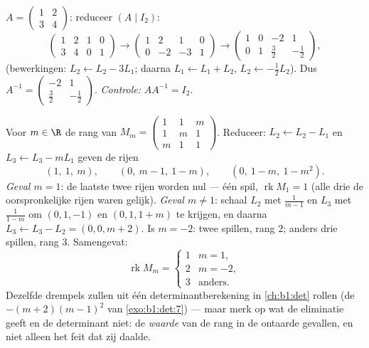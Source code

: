 \begin{example}\label{ex:b1:matrices:inverse}
$A = \begin{pmatrix} 1 & 2 \\ 3 & 4 \end{pmatrix}$: reduceer $(A
\mid I_2)$:
\[
\begin{pmatrix} 1 & 2 & 1 & 0\\ 3 & 4 & 0 & 1 \end{pmatrix}
\to
\begin{pmatrix} 1 & 2 & 1 & 0\\ 0 & -2 & -3 & 1 \end{pmatrix}
\to
\begin{pmatrix} 1 & 0 & -2 & 1\\ 0 & 1 & \tfrac32 & -\tfrac12
\end{pmatrix},
\]
(bewerkingen: $L_2 \leftarrow L_2 - 3L_1$; daarna $L_1 \leftarrow
L_1 + L_2$, $L_2 \leftarrow -\frac12 L_2$). Dus $A^{-1} =
\begin{pmatrix} -2 & 1 \\ \tfrac32 & -\tfrac12\end{pmatrix}$.
\emph{Controle:} $AA^{-1} = I_2$.
\end{example}

\begin{example}
\label{ex:b1:matrices:rankparameter}
Voor $m \in \R$ de rang van $M_m = \begin{pmatrix} 1 & 1 & m\\ 1 &
m & 1\\ m & 1 & 1\end{pmatrix}$. Reduceer: $L_2 \leftarrow L_2 -
L_1$ en $L_3 \leftarrow L_3 - mL_1$ geven de rijen
\[
(1,\ 1,\ m), \qquad (0,\ m - 1,\ 1 - m), \qquad
(0,\ 1 - m,\ 1 - m^2).
\]
\emph{Geval $m = 1$}: de laatste twee rijen worden nul --- één
spil, $\operatorname{rk} M_1 = 1$ (alle drie de oorspronkelijke
rijen waren gelijk). \emph{Geval $m \neq 1$}: schaal $L_2$ met
$\frac1{m-1}$ en $L_3$ met $\frac1{1-m}$ om $(0, 1, -1)$ en $(0,
1, 1 + m)$ te krijgen, en daarna $L_3 \leftarrow L_3 - L_2 = (0,
0, m + 2)$. Is $m = -2$: twee spillen, rang $2$; anders drie
spillen, rang $3$. Samengevat:
\[
\operatorname{rk} M_m =
\begin{cases}
1 & m = 1,\\
2 & m = -2,\\
3 & \text{anders}.
\end{cases}
\]
Dezelfde drempels zullen uit één determinantberekening in
\cref{ch:b1:det} rollen (de  $-(m+2)(m-1)^2$ van
\cref{exo:b1:det:7}) --- maar merk op wat de eliminatie geeft en de
determinant niet: de \emph{waarde} van de rang in de ontaarde
gevallen, en niet alleen het feit dat zij daalde.
\end{example}

